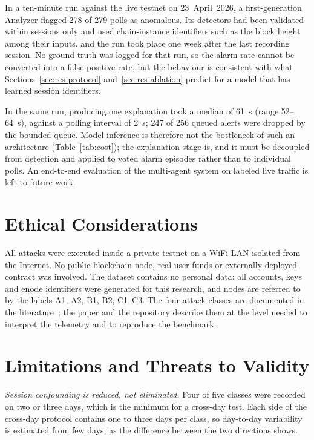 \documentclass[journal]{IEEEtran}
\begin{document}
In a ten-minute run against the live testnet on 23~April~2026, a first-generation Analyzer flagged 278 of 279 polls as anomalous. Its detectors had been validated within sessions only and used chain-instance identifiers such as the block height among their inputs, and the run took place one week after the last recording session. No ground truth was logged for that run, so the alarm rate cannot be converted into a false-positive rate, but the behaviour is consistent with what Sections~\ref{sec:res-protocol} and~\ref{sec:res-ablation} predict for a model that has learned session identifiers.

In the same run, producing one explanation took a median of 61~s (range 52--64~s), against a polling interval of 2~s; 247 of 256 queued alerts were dropped by the bounded queue. Model inference is therefore not the bottleneck of such an architecture (Table~\ref{tab:cost}); the explanation stage is, and it must be decoupled from detection and applied to voted alarm episodes rather than to individual polls. An end-to-end evaluation of the multi-agent system on labeled live traffic is left to future work.

\section{Ethical Considerations}\label{sec:ethics}
All attacks were executed inside a private testnet on a WiFi LAN isolated from the Internet. No public blockchain node, real user funds or externally deployed contract was involved. The dataset contains no personal data: all accounts, keys and enode identifiers were generated for this research, and nodes are referred to by the labels A1, A2, B1, B2, C1--C3. The four attack classes are documented in the literature~\cite{heilman2015,marcus2018,douceur2002,baqer2016,saad2020}; the paper and the repository describe them at the level needed to interpret the telemetry and to reproduce the benchmark.

\section{Limitations and Threats to Validity}\label{sec:threats}
\emph{Session confounding is reduced, not eliminated.} Four of five classes were recorded on two or three days, which is the minimum for a cross-day test. Each side of the cross-day protocol contains one to three days per class, so day-to-day variability is estimated from few days, as the difference between the two directions shows.
\end{document}
